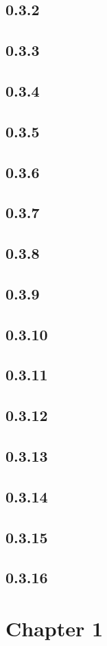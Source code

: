 \documentclass[11pt]{article}
\begin{document}
	\subsection*{0.3.2}
		
	\subsection*{0.3.3}
	\subsection*{0.3.4}
	\subsection*{0.3.5}
	\subsection*{0.3.6}
	\subsection*{0.3.7}
	\subsection*{0.3.8}
	\subsection*{0.3.9}
	\subsection*{0.3.10}
	\subsection*{0.3.11}
	\subsection*{0.3.12}
	\subsection*{0.3.13}
	\subsection*{0.3.14}
	\subsection*{0.3.15}
	\subsection*{0.3.16}

\section*{Chapter 1}
	

		
\end{document}
